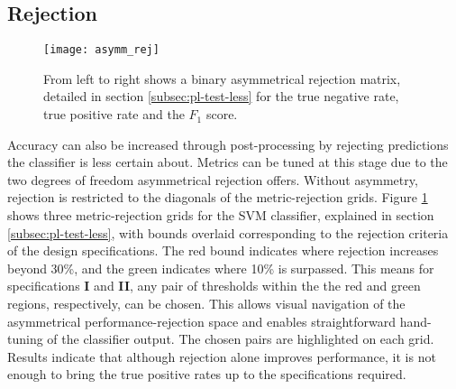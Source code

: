     \subsection{Rejection}
    \label{subsec:exp-postproc-rej}
        \begin{figure}[ht]
            \centering
            \texttt{[image: asymm\_rej]}
            \caption{From left to right shows a binary asymmetrical rejection matrix, detailed in section \ref{subsec:pl-test-less} for the true negative rate, true positive rate and the $F_1$ score.}
            \label{fig:exp-postproc-asymrej}
        \end{figure}
        Accuracy can also be increased through post-processing by rejecting predictions the classifier is less certain about. Metrics can be tuned at this stage due to the two degrees of freedom asymmetrical rejection offers. Without asymmetry, rejection is restricted to the diagonals of the metric-rejection grids. Figure \ref{fig:exp-postproc-asymrej} shows three metric-rejection grids for the SVM classifier, explained in section \ref{subsec:pl-test-less}, with bounds overlaid corresponding to the rejection criteria of the design specifications. The red bound indicates where rejection increases beyond 30\%, and the green indicates where 10\% is surpassed. This means for specifications \textbf{I} and \textbf{II}, any pair of thresholds within the the red and green regions, respectively, can be chosen. This allows visual navigation of the asymmetrical performance-rejection space and enables straightforward hand-tuning of the classifier output. The chosen pairs are highlighted on each grid. Results indicate that although rejection alone improves performance, it is not enough to bring the true positive rates up to the specifications required.
    
